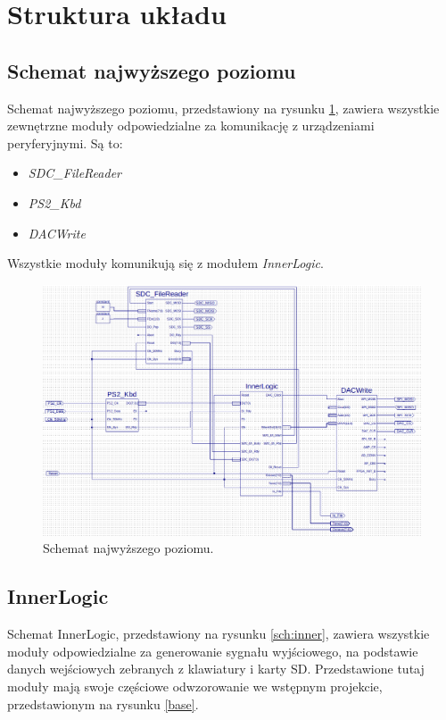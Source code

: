 \documentclass[a4paper,12pt]{article}
\begin{document}
\section{Struktura układu}
\subsection{Schemat najwyższego poziomu}
Schemat najwyższego poziomu, przedstawiony na rysunku \ref{sch:main}, zawiera wszystkie zewnętrzne moduły odpowiedzialne za komunikację z urządzeniami peryferyjnymi. Są to:
\begin{itemize}[noitemsep]
  \item \textit{SDC\_FileReader\cite{web:sdcfilereader}}
  \item \textit{PS2\_Kbd\cite{web:ps2kbd}}
  \item \textit{DACWrite\cite{web:dacwrite}}
\end{itemize}
Wszystkie moduły komunikują się z modułem \textit{InnerLogic}.


\begin{figure}[h]
  \centering
  \includegraphics[width=\linewidth]{images/main}
  \caption{Schemat najwyższego poziomu.}
  \label{sch:main}
\end{figure}

\subsection{InnerLogic}

Schemat InnerLogic, przedstawiony na rysunku \ref{sch:inner}, zawiera wszystkie moduły odpowiedzialne za generowanie sygnału wyjściowego, na podstawie danych wejściowych zebranych z klawiatury i karty SD. Przedstawione tutaj moduły mają swoje częściowe odwzorowanie we wstępnym projekcie, przedstawionym na rysunku \ref{base}.
\end{document}
